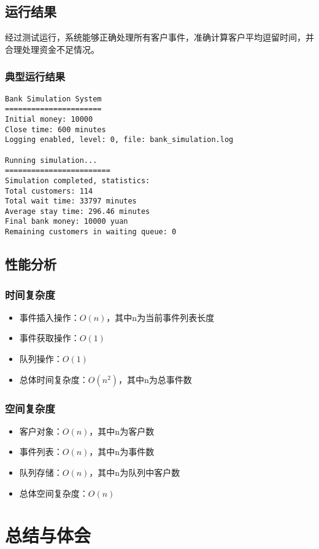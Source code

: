 \documentclass[12pt,a4paper]{article}
\begin{document}
\subsection{运行结果}
经过测试运行，系统能够正确处理所有客户事件，准确计算客户平均逗留时间，并合理处理资金不足情况。

\subsubsection{典型运行结果}
\begin{verbatim}
Bank Simulation System
======================
Initial money: 10000
Close time: 600 minutes
Logging enabled, level: 0, file: bank_simulation.log

Running simulation...
========================
Simulation completed, statistics:
Total customers: 114
Total wait time: 33797 minutes
Average stay time: 296.46 minutes
Final bank money: 10000 yuan
Remaining customers in waiting queue: 0
\end{verbatim}

\subsection{性能分析}
\subsubsection{时间复杂度}
\begin{itemize}
\item 事件插入操作：$O(n)$，其中n为当前事件列表长度
\item 事件获取操作：$O(1)$
\item 队列操作：$O(1)$
\item 总体时间复杂度：$O(n^2)$，其中n为总事件数
\end{itemize}

\subsubsection{空间复杂度}
\begin{itemize}
\item 客户对象：$O(n)$，其中n为客户数
\item 事件列表：$O(n)$，其中n为事件数
\item 队列存储：$O(n)$，其中n为队列中客户数
\item 总体空间复杂度：$O(n)$
\end{itemize}

\section{总结与体会}
\end{document}
